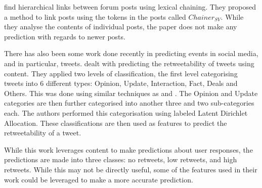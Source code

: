  find hierarchical links between forum posts using lexical 
chaining.  They proposed a method to link posts using the tokens in the posts 
called $Chainer_{SV}$. While they analyse the contents of individual posts, the 
paper does not make any prediction with regards to newer posts.


There has also been some work done recently in predicting events in social 
media, and in particular, tweets.   dealt with predicting the 
retweetability of tweets using content. They applied two levels of 
classification, the first level categorising tweets into 6 different types: 
Opinion, Update, Interaction, Fact, Deals and Others. This was done using 
similar techniques as  and . The Opinion 
and Update categories are then further categorised into another three and two 
sub-categories each. The authors performed this categorisation using labeled 
Latent Dirichlet Allocation. These classifications are then used as features to 
predict the retweetability of a tweet. 

While this work leverages content to make predictions about user responses, the 
predictions are made into three classes: no retweets, low retweets, and high 
retweets. While this may not be directly useful, some of the features used in 
their work could be leveraged to make a more accurate prediction.





